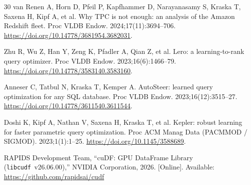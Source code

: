 \documentclass[10pt,a4paper]{article}
\begin{document}
{\begin{thebibliography}{30}
van Renen A, Horn D, Pfeil P, Kapfhammer D, Narayanasamy S, Kraska T, Saxena H, Kipf A, et al. Why TPC is not enough: an analysis of the Amazon Redshift fleet. Proc VLDB Endow. 2024;17(11):3694--706. \url{https://doi.org/10.14778/3681954.3682031}.

Zhu R, Wu Z, Han Y, Zeng K, Pfadler A, Qian Z, et al. Lero: a learning-to-rank query optimizer. Proc VLDB Endow. 2023;16(6):1466--79. \url{https://doi.org/10.14778/3583140.3583160}.

Anneser C, Tatbul N, Kraska T, Kemper A. AutoSteer: learned query optimization for any SQL database. Proc VLDB Endow. 2023;16(12):3515--27. \url{https://doi.org/10.14778/3611540.3611544}.

Doshi K, Kipf A, Nathan V, Saxena H, Kraska T, et al. Kepler: robust learning for faster parametric query optimization. Proc ACM Manag Data (PACMMOD / SIGMOD). 2023;1(1):1--25. \url{https://doi.org/10.1145/3588689}.


RAPIDS Development Team, ``cuDF: GPU DataFrame Library (\texttt{libcudf}~v26.06.00),'' NVIDIA Corporation, 2026. [Online]. Available: \url{https://github.com/rapidsai/cudf}
\end{thebibliography}
}

\end{document}
